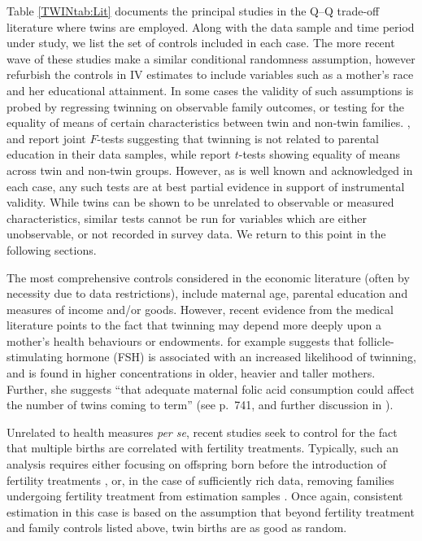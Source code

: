 \documentclass[subeqn]{article}
\begin{document}
\begin{spacing}{1.4}
Table \ref{TWINtab:Lit} documents the principal studies in the Q--Q trade-off 
literature where twins are employed.  Along with the data sample and time period 
under study, we list the set of controls included in each case.  The more recent
wave of these studies make a similar conditional randomness assumption, however
refurbish the controls in IV estimates to include variables such as a mother's 
race and her educational attainment.  In some cases the validity of such 
assumptions is probed by regressing twinning on observable family outcomes, or 
testing for the equality of means of certain characteristics between twin and
non-twin families. \citet{Blacketal2005}, \citet{Lietal2008} and 
\citet{Sanhueza2009} report joint $F$-tests suggesting that twinning is not 
related to parental education in their data samples, while 
\citet{RosenzweigZhang2009} report $t$-tests showing equality of means across 
twin and non-twin groups. However, as is well known and acknowledged in each 
case, any such tests are at best partial evidence in support of instrumental 
validity. While twins can be shown to be unrelated to observable or measured 
characteristics, similar tests cannot be run for variables which are either 
unobservable, or not recorded in survey data. We return to this point in the 
following sections.

The most comprehensive controls considered in the economic literature (often by
necessity due to data restrictions), include maternal age, parental education
and measures of income and/or goods.  However, recent evidence from the medical
literature points to the fact that twinning may depend more deeply upon a 
mother's health behaviours or endowments. \citet{Hall2003} for example suggests 
that follicle-stimulating hormone (FSH) is associated with an increased 
likelihood of twinning, and is found in higher concentrations in older, heavier 
and taller mothers. Further, she suggests ``that adequate maternal folic acid 
consumption could affect the number of twins coming to term'' (see p.\ 741, and 
further discussion in \citet{Lietal2003}).

Unrelated to health measures \emph{per se}, recent studies seek to control for 
the fact that multiple births are correlated with fertility treatments. 
Typically, such an analysis requires either focusing on offspring born before
the introduction of fertility treatments \citep{Caceres2006,Angristetal2010}, 
or, in the case of sufficiently rich data, removing families undergoing fertility 
treatment from estimation samples \citep{Braakman2014}. Once again, consistent 
estimation in this case is based on the assumption that beyond fertility 
treatment and family controls listed above, twin births are as good as random.


\end{spacing}
\end{document}
